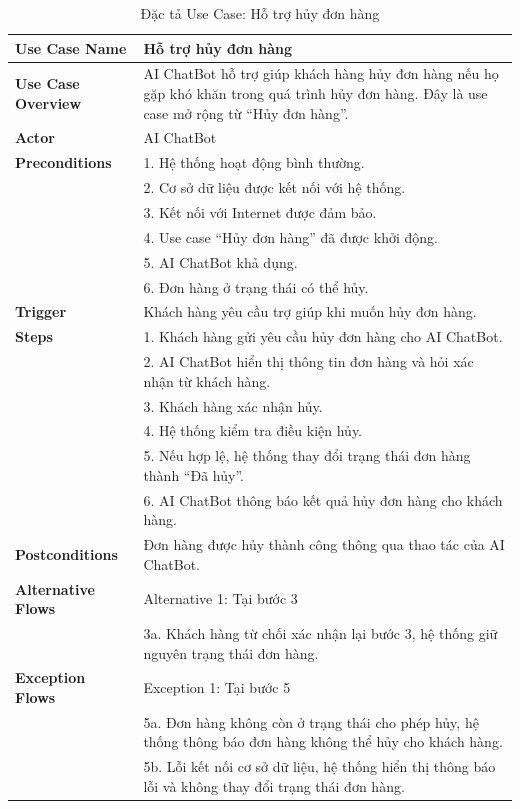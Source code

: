 {\begin{longtable}{|>{\bfseries}p{4cm}|p{11.5cm}|}
\caption{Đặc tả Use Case: Hỗ trợ hủy đơn hàng}
\label{tab:uc-chatbot-cancel-support} \\
\hline
\textbf{Use Case Name} & Hỗ trợ hủy đơn hàng \\
\hline
\textbf{Use Case Overview} & AI ChatBot hỗ trợ giúp khách hàng hủy đơn hàng nếu họ gặp khó khăn trong quá trình hủy đơn hàng. Đây là use case mở rộng từ “Hủy đơn hàng”. \\
\hline
\textbf{Actor} & AI ChatBot \\
\hline
\textbf{Preconditions} & 1. Hệ thống hoạt động bình thường. \\
& 2. Cơ sở dữ liệu được kết nối với hệ thống. \\
& 3. Kết nối với Internet được đảm bảo. \\
& 4. Use case “Hủy đơn hàng” đã được khởi động. \\
& 5. AI ChatBot khả dụng. \\
& 6. Đơn hàng ở trạng thái có thể hủy. \\
\hline
\textbf{Trigger} & Khách hàng yêu cầu trợ giúp khi muốn hủy đơn hàng. \\
\hline
\textbf{Steps} & 1. Khách hàng gửi yêu cầu hủy đơn hàng cho AI ChatBot. \\
& 2. AI ChatBot hiển thị thông tin đơn hàng và hỏi xác nhận từ khách hàng. \\
& 3. Khách hàng xác nhận hủy. \\
& 4. Hệ thống kiểm tra điều kiện hủy. \\
& 5. Nếu hợp lệ, hệ thống thay đổi trạng thái đơn hàng thành “Đã hủy”. \\
& 6. AI ChatBot thông báo kết quả hủy đơn hàng cho khách hàng. \\
\hline
\textbf{Postconditions} & Đơn hàng được hủy thành công thông qua thao tác của AI ChatBot. \\
\hline
\textbf{Alternative Flows} & Alternative 1: Tại bước 3 \\
& 3a. Khách hàng từ chối xác nhận lại bước 3, hệ thống giữ nguyên trạng thái đơn hàng. \\
\hline
\textbf{Exception Flows} & Exception 1: Tại bước 5 \\
& 5a. Đơn hàng không còn ở trạng thái cho phép hủy, hệ thống thông báo đơn hàng không thể hủy cho khách hàng. \\
& 5b. Lỗi kết nối cơ sở dữ liệu, hệ thống hiển thị thông báo lỗi và không thay đổi trạng thái đơn hàng. \\
\hline
\end{longtable}

}
